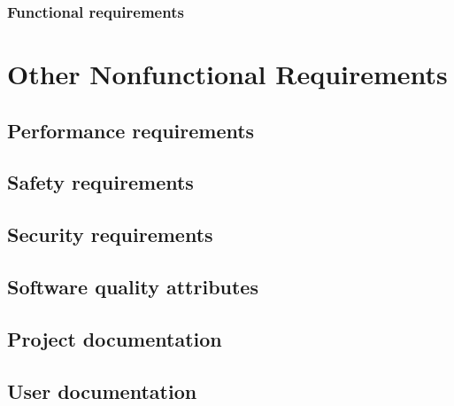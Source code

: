 \documentclass[10pt]{article}
\begin{document}
\lipsum[10]

\subsubsection{ Functional requirements}

\lipsum[10]








\section{Other Nonfunctional Requirements}

\subsection{Performance requirements}

\lipsum[10]

\subsection{Safety requirements}

\lipsum[10]

\subsection{Security requirements}

\lipsum[10]

\subsection{Software quality attributes}

\lipsum[10]

\subsection{Project documentation}

\lipsum[10]

\subsection{User documentation}
\end{document}
